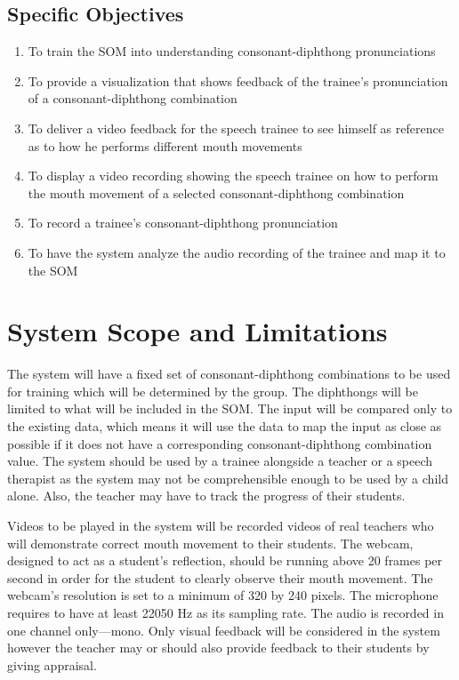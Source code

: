 \subsection{Specific Objectives}
\begin{enumerate}
\item To train the SOM into understanding consonant-diphthong pronunciations
\item To provide a visualization that shows feedback of the trainee's pronunciation of a consonant-diphthong combination
\item To deliver a video feedback for the speech trainee to see himself as reference as to how he performs different mouth movements
\item To display a video recording showing the speech trainee on how to perform the mouth movement of a selected consonant-diphthong combination
\item To record a trainee's consonant-diphthong pronunciation
\item To have the system analyze the audio recording of the trainee and map it to the SOM
\end{enumerate}

\section{System Scope and Limitations}
The system will have a fixed set of consonant-diphthong combinations to be used for training which will be determined by the group. The diphthongs will be limited to what will be included in the SOM. The input will be compared only to the existing data, which means it will use the data to map the input as close as possible if it does not have a corresponding consonant-diphthong combination value. The system should be used by a trainee alongside a teacher or a speech therapist as the system may not be comprehensible enough to be used by a child alone. Also, the teacher may have to track the progress of their students.

Videos to be played in the system will be recorded videos of real teachers who will demonstrate correct mouth movement to their students. The webcam, designed to act as a student's reflection, should be running above 20 frames per second in order for the student to clearly observe their mouth movement. The webcam's resolution is set to a minimum of 320 by 240 pixels. The microphone requires to have at least 22050 Hz as its sampling rate. The audio is recorded in one channel only---mono. Only visual feedback will be considered in the system however the teacher may or should also provide feedback to their students by giving appraisal.

